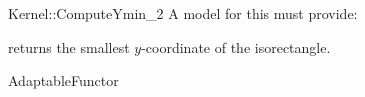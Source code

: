 \begin{ccRefFunctionObjectConcept}{Kernel::ComputeYmin_2}
A model for this must provide:


       {returns the smallest $y$-coordinate of the isorectangle.}


\ccRefines
AdaptableFunctor



\end{ccRefFunctionObjectConcept}
